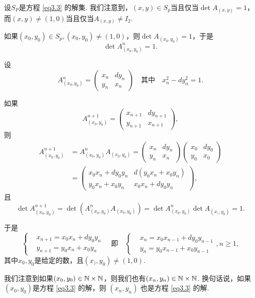 设$S_P$是方程 \eqref{eq3.3} 的解集. 我们注意到，$(x,y)\in S_p$当且仅当$\det A_{(x,y)}=1$，而$(x,y)\ne(1,0)$当且仅当$A_{(x,y)}\ne I_2$.

如果$(x_0,y_0)\in S_p,(x_0,y_0)\ne(1,0)$，则$\det A_{(x_0,y_0)}=1$，于是
\[
  \det A_{(x_0,y_0)}^n = 1.
\]

设
\[
  A_{(x_0,y_0)}^n = \begin{pmatrix}
    x_n & dy_n \\
    y_n & x_n
  \end{pmatrix} \quad \text{其中}\quad
  x_n^2 - dy_n^2 = 1.
\]

如果
\[
  A_{(x_0,y_0)}^{n+1} = \begin{pmatrix}
    x_{n+1} & dy_{n+1} \\
    y_{n+1} & x_{n+1}
  \end{pmatrix},
\]
则
\begin{align*}
  A_{(x_0,y_0)}^{n+1} & = A_{(x_0,y_0)}^nA_{(x_0,y_0)} =
  \begin{pmatrix}
    x_n & dy_n \\
    y_n & x_n
  \end{pmatrix}
  \begin{pmatrix}
    x_0 & dy_0 \\
    y_0 & x_0
  \end{pmatrix} \\
  & = \begin{pmatrix}
    x_0x_n + dy_0y_n & d(y_0x_n + x_0y_n) \\
    y_0x_n + x_0y_n & x_0x_n + dy_0y_n
  \end{pmatrix},
\end{align*}
且
\[
  \det A_{(x_0,y_0)}^{n+1} = \det \left( A_{(x_0,y_0)}^nA_{(x_0,y_0)} \right) =
  \det A_{(x_0,y_0)}^n \det A_{(x_),y_0)} = 1.
\]

于是
\[
  \left\{
    \begin{aligned}
      & x_{n+1} = x_0x_n + dy_0y_n \\
      & y_{n+1} = y_0x_n + x_0y_n
    \end{aligned}
  \right. \quad \text{即} \quad
  \left\{
    \begin{aligned}
      & x_{n} = x_0x_{n-1} + dy_0y_{n-1} \\
      & y_{n} = y_0x_{n-1} + x_0y_{n-1}
    \end{aligned}
  \right.,n\ge1,
\]
其中$x_0,y_0$是给定的数，且$(x_),y_0)\ne(1,0)$.

我们注意到如果$(x_0,y_0)\in\mathbb N\times\mathbb N$，则我们也有$(x_n,y_n)\in\mathbb N\times\mathbb N$. 换句话说，如果$(x_0,y_0)$是方程 \eqref{eq3.3} 的解，则 $(x_n,y_n)$ 也是方程 \eqref{eq3.3} 的解.

